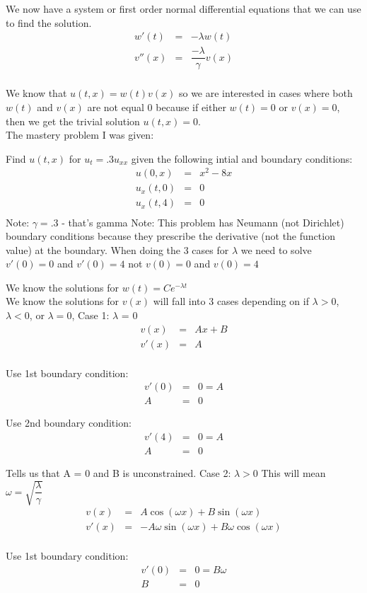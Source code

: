 \documentclass{article}
\newcommand{\bea}{\begin{eqnarray*}}
\newcommand{\eea}{\end{eqnarray*}}
\begin{document}
We now have a system or first order normal differential equations that we can use to find the solution.
\bea
w'(t) &=& -\lambda w(t) \\
v''(x) &=& \dfrac{-\lambda}{\gamma}v(x) \\
\eea

We know that $u(t,x) = w(t)v(x)$ so we are interested in cases where both $w(t)$ and $v(x)$ are not equal 0 because if either $w(t)=0$ or $v(x)=0$, then we get the trivial solution $u(t,x) = 0$.\\

The mastery problem I was given: \newline

Find $u(t,x)$ for $u_t=.3u_{xx}$ given the following intial and boundary conditions:
\bea
u(0,x)&=&x^2-8x\\
u_x(t,0)&=&0\\
u_x(t,4)&=&0\\
\eea
Note: $\gamma=.3$ - that's gamma \newline
Note: This problem has Neumann (not Dirichlet) boundary conditions because they prescribe the derivative (not the function value) at the boundary. When doing the 3 cases for $\lambda$ we need to solve $v'(0)=0$ and $v'(0)=4$ not $v(0)=0$ and $v(0)=4$\newline

We know the solutions for $w(t)=Ce^{-\lambda t}$ \\

We know the solutions for $v(x)$ will fall into 3 cases depending on if $\lambda > 0$, $\lambda < 0$, or $\lambda = 0$, \newline
Case 1: $\lambda$ = 0 
\bea
v(x) &=& Ax+B\\
v'(x) &=& A\\
\eea

Use 1st boundary condition:
\bea
v'(0) &=& 0 = A\\
A &=& 0
\eea

Use 2nd boundary condition:
\bea
v'(4) &=& 0 = A\\
A &=& 0
\eea

Tells us that A = 0 and B is unconstrained.\newline
Case 2: $\lambda > 0$ This will mean $\omega=\sqrt{\dfrac{\lambda}{\gamma}}$
\bea
v(x) &=& A\cos(\omega x)+B\sin(\omega x) \\
v'(x) &=& -A\omega \sin(\omega x)+B\omega \cos(\omega x)  \\
\eea

Use 1st boundary condition:
\bea
v'(0) &=& 0 = B\omega\\
B &=& 0
\eea
\end{document}
